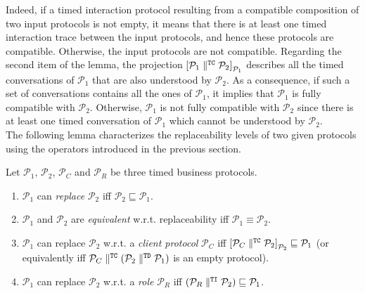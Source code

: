 Indeed, if a timed interaction protocol resulting from a compatible composition of two input protocols is not empty, it means that there is at least one timed interaction trace between the input protocols, and hence these protocols are compatible. Otherwise, the input protocols are not compatible. Regarding the second item of the lemma, the projection $\left[ \mathcal{P}_1 \parallel^{\mathtt{TC}} \mathcal{P}_2 \right]_{\mathcal{P}_1}$ describes all the timed conversations of $\mathcal{P}_1$ that are also understood by $\mathcal{P}_2$. As a consequence, if such a set of conversations contains all the ones of $\mathcal{P}_1$, it implies that $\mathcal{P}_1$ is fully compatible with $\mathcal{P}_2$. Otherwise, $\mathcal{P}_1$ is not fully compatible with $\mathcal{P}_2$ since there is at least one timed conversation of $\mathcal{P}_1$ which cannot be understood by $\mathcal{P}_2$.\\

The following lemma characterizes the replaceability levels of two given protocols using the operators introduced in the previous section.

\begin{lemma}
Let $\mathcal{P}_1$, $\mathcal{P}_2$, $\mathcal{P}_C$ and $\mathcal{P}_R$ be three timed business protocols.
\begin{enumerate}

    \item $\mathcal{P}_1$ can \emph{replace} $\mathcal{P}_2$ iff $\mathcal{P}_2 \sqsubseteq \mathcal{P}_1$.

    \item $\mathcal{P}_1$ and $\mathcal{P}_2$ are \emph{equivalent} w.r.t. replaceability iff $\mathcal{P}_1 \equiv \mathcal{P}_2$.

    \item $\mathcal{P}_1$ can replace $\mathcal{P}_2$ w.r.t. a \emph{client protocol} $\mathcal{P}_C$ iff $\left[ \mathcal{P}_C \parallel^{\mathtt{TC}} \mathcal{P}_2 \right]_{\mathcal{P}_2} \sqsubseteq \mathcal{P}_1$ (or equivalently iff
$\mathcal{P}_C \parallel^{\mathtt{TC}} (\mathcal{P}_2 \parallel^{\mathtt{TD}} \mathcal{P}_1)$ is an empty protocol).

    \item $\mathcal{P}_1$ can replace $\mathcal{P}_2$ w.r.t. a \emph{role} $\mathcal{P}_R$ iff $(\mathcal{P}_R \parallel^{\mathtt{TI}} \mathcal{P}_2) \sqsubseteq \mathcal{P}_1$.

\end{enumerate}
\end{lemma}

